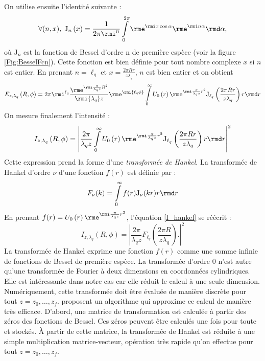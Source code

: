 On utilise ensuite l'identité suivante  :
\begin{equation*}
\forall(n,x),\;{{\mathrm{J}}_n}\left( x \right) = \frac{1}{{2{\pi }{\rmi^n}}}\mathop \int \limits_0^{2{\pi }} {\rme^{\rmi x\cos \alpha }}{\rme^{\rmi n\alpha }}{\rmd}\alpha,
\end{equation*}
où ${{\mathrm{J}}_n}$ est la fonction de Bessel d'ordre n de première espèce (voir la figure \ref{Fig:BesselFcn}). Cette fonction est bien définie pour tout nombre complexe $x$ si $n$ est entier. En prenant $n=\ell_q$ et $x=\frac{{ 2{\pi }Rr}}{{z{\lambda _q}}}$, $n$ est bien entier et on obtient
\begin{equation*}
	{E_{z,{\lambda _q}}}\left( {R,\phi } \right) = 
	2\pi\rmi^{\ell_q}
	\frac{{{\rme^{\rmi\frac{{\pi}}{{{\lambda _q}z}}{R^2}}}}}{{\rmi{\lambda _q}z}}
	\rme^{\rmi{\ell _{q}{\phi}}}
	\int \limits_0^\infty  {U_0}\left( r \right){\rme^{\rmi\frac{{\pi }}{{{\lambda _q}z}}{r^2}}}
	\mathrm{J}_{\ell_q}\left(\frac{{2{\pi }Rr}}{{z{\lambda_q}}}\right)r{\rmd}r
\end{equation*}
On mesure finalement l'intensité :
\begin{equation}
	{I_{z,{\lambda_q}}}\left( {R,\phi } \right) = {\left|\frac{{{2\pi}}}{{{\lambda _q}z}}
	\int \limits_0^\infty  {U_0}\left( r \right){\rme^{\rmi\frac{{\pi }}{{{\lambda _q}z}}{r^2}}}
	\mathrm{J}_{\ell_q}\left(\frac{{2{\pi }Rr}}{{z{\lambda_q}}}\right)r{\rmd}r\right|}^2
	\label{I_hankel}
\end{equation}
Cette expression prend la forme d'une \textit{transformée de Hankel}. La transformée de Hankel d'ordre $\nu$ d'une fonction $f(r)$ est définie par :
\begin{equation*}
F_\nu(k)=\int \limits_0^\infty {f(r)\mathrm{J}_\nu(kr)r\rmd r}
\end{equation*}
En prenant $f(r) = {U_0}\left( r \right){\rme^{\rmi\frac{{\pi }}{{{\lambda _q}z}}{r^2}}}$, l'équation \ref{I_hankel} se réécrit :
\begin{equation}
{I_{z,{\lambda_q}}}\left( {R,\phi } \right)=
{\left|\frac{{{2\pi}}}{{{\lambda _q}z}}
F_{\ell_q}\left(\frac{{2{\pi }R}}{{z{\lambda_q}}}\right).
\right|}^2
\label{eq:hankelprop}
\end{equation}
La transformée de Hankel exprime une fonction $f(r)$ comme une somme infinie de fonctions de Bessel de première espèce. La transformée d'ordre 0 n'est autre qu'une transformée de Fourier à deux dimensions en coordonnées cylindriques. Elle est intéressante dans notre cas car elle réduit le calcul à une seule dimension. Numériquement, cette transformée doit être évaluée de manière discrète pour tout $z={z_0,\ldots,z_{f}}$. \cite{GuizarJOSA2004} proposent un algorithme qui approxime ce calcul de manière très efficace. D'abord, une matrice de transformation est calculée à partir des zéros des fonctions de Bessel. Ces zéros peuvent être calculés une fois pour toute et stockés. \`{A} partir de cette matrice, la transformée de Hankel est réduite à une simple multiplication matrice-vecteur, opération très rapide qu'on effectue pour tout $z={z_0,\ldots,z_{f}}$.

